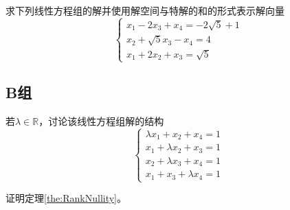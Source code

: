 \begin{reidai}
	求下列线性方程组的解并使用解空间与特解的和的形式表示解向量
	$$
	\left\{\begin{matrix} 
		x_1-2x_3+x_4=-2\sqrt{5}+1 \\  
		x_2+\sqrt{5}x_3-x_4= 4 \\
		x_1+2x_2+x_3=\sqrt{5}
	  \end{matrix}\right. 
	$$
\end{reidai}

\subsection{B组}

\begin{reidai}
	若$\lambda\in \mathbb{R}$，讨论该线性方程组解的结构$$\left\{\begin{matrix} 
		\lambda x_1+x_2+x_4=1 \\
		x_1+\lambda x_2+x_3=1 \\
		x_2+\lambda x_3+x_4=1 \\
		x_1+x_3+\lambda x_4=1 
	  \end{matrix}\right. $$
\end{reidai}

\begin{reidai}
	证明定理\ref{the:RankNullity}。
\end{reidai}